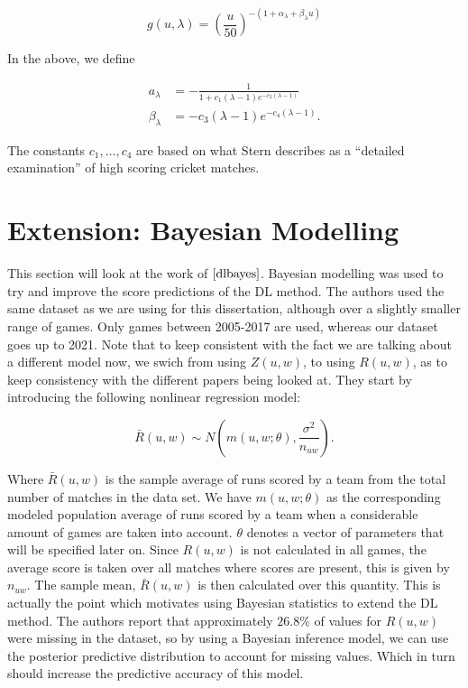 \begin{equation}
    g(u,\lambda) = \left (\frac{u}{50} \right)^{-(1+\alpha_\lambda+\beta_\lambda u)}
    \label{gfunc}
\end{equation}

In the above, we define 

\begin{align*}
    a_\lambda &= -\frac{1}{1+c_1(\lambda-1)e^{-c_2(\lambda-1)}}\\
    \beta_\lambda &= -c_3(\lambda-1)e^{-c_4(\lambda-1)}.
\end{align*}

The constants $c_1,\ldots,c_4$ are based on what Stern describes as a ``detailed examination'' of high scoring cricket matches.

\section{Extension: Bayesian Modelling}
This section will look at the work of $\cite{dlbayes}$. Bayesian modelling was used to try and improve the score predictions
of the DL method. The authors used the same dataset as we are using for this dissertation, although over a slightly smaller range of games.
Only games between 2005-2017 are used, whereas our dataset goes up to 2021. Note that to keep consistent with the fact we are talking about a different
model now, we swich from using $Z(u,w)$, to using $R(u,w)$, as to keep consistency with the different papers being looked at.
They start by introducing the following nonlinear regression model:

\begin{equation}
    \label{dlRegress}
    \bar{R}(u,w) \sim N(m(u,w;\theta),\frac{\sigma^2}{n_{uw}}).
\end{equation}

Where $\bar{R}(u,w)$ is the sample average of runs scored by a team from the total number of matches in the data set. We have $m(u,w;\theta)$
as the corresponding modeled population average of runs scored by a team when a considerable amount of games are taken into account. $\theta$ denotes 
a vector of parameters that will be specified later on. Since $R(u,w)$ is not calculated in all games, the average score is taken over all matches where
scores are present, this is given by $n_{uw}$. The sample mean, $\bar{R}(u,w)$ is then calculated over this quantity. This is actually the point which motivates
using Bayesian statistics to extend the DL method. The authors report that approximately $26.8\%$ of values for $R(u,w)$ were missing in the dataset, so by 
using a Bayesian inference model, we can use the posterior predictive distribution to account for missing values. Which in turn should increase the 
predictive accuracy of this model. \\

